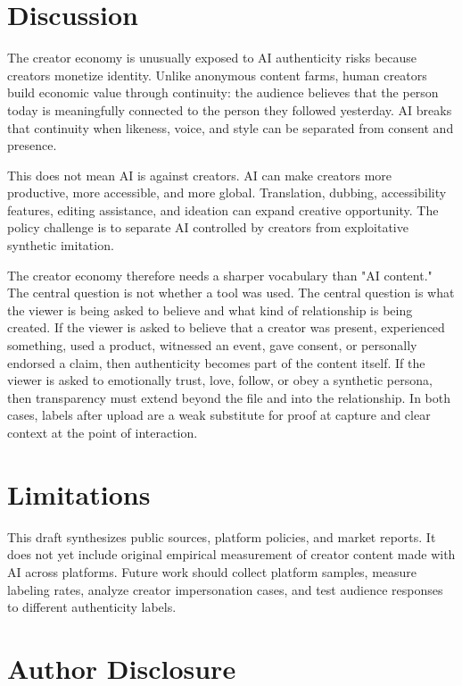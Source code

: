\documentclass[11pt]{article}
\begin{document}
\section{Discussion}

The creator economy is unusually exposed to AI authenticity risks because creators monetize identity. Unlike anonymous content farms, human creators build economic value through continuity: the audience believes that the person today is meaningfully connected to the person they followed yesterday. AI breaks that continuity when likeness, voice, and style can be separated from consent and presence.

This does not mean AI is against creators. AI can make creators more productive, more accessible, and more global. Translation, dubbing, accessibility features, editing assistance, and ideation can expand creative opportunity. The policy challenge is to separate AI controlled by creators from exploitative synthetic imitation.

The creator economy therefore needs a sharper vocabulary than "AI content." The central question is not whether a tool was used. The central question is what the viewer is being asked to believe and what kind of relationship is being created. If the viewer is asked to believe that a creator was present, experienced something, used a product, witnessed an event, gave consent, or personally endorsed a claim, then authenticity becomes part of the content itself. If the viewer is asked to emotionally trust, love, follow, or obey a synthetic persona, then transparency must extend beyond the file and into the relationship. In both cases, labels after upload are a weak substitute for proof at capture and clear context at the point of interaction.

\section{Limitations}

This draft synthesizes public sources, platform policies, and market reports. It does not yet include original empirical measurement of creator content made with AI across platforms. Future work should collect platform samples, measure labeling rates, analyze creator impersonation cases, and test audience responses to different authenticity labels.

\section{Author Disclosure}
\end{document}
